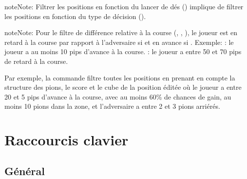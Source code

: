 \documentclass[letterpaper,10pt,french]{sphinxmanual}
\begin{document}
\begin{sphinxadmonition}{note}{Note:}
\sphinxAtStartPar
Filtrer les positions en fonction du lancer de dés () implique  de filtrer les positions en fonction du type de décision ().
\end{sphinxadmonition}

\begin{sphinxadmonition}{note}{Note:}
\sphinxAtStartPar
Pour le filtre de différence relative à la course (, ,
), le joueur est en retard à la course par rapport à l’adversaire si
 et en avance si . Exemple:  : le joueur a au moins 10 pips
d’avance à la course.  : le joueur a entre 50 et 70 pips de retard à
la course.
\end{sphinxadmonition}

\sphinxAtStartPar
Par exemple, la commande  filtre toutes les
positions en prenant en compte la structure des pions, le score et le cube
de la position éditée où le joueur a entre 20 et 5 pips d’avance à la
course, avec au moins 60\% de chances de gain, au moins 10 pions dans la
zone, et l’adversaire a entre 2 et 3 pions arriérés.

\sphinxstepscope


\section{Raccourcis clavier}
\label{\detokenize{raccourcis:raccourcis-clavier}}\label{\detokenize{raccourcis:raccourcis}}\label{\detokenize{raccourcis::doc}}

\subsection{Général}
\label{\detokenize{raccourcis:general}}\label{\detokenize{raccourcis:raccourcis-generaux}}
\end{document}
